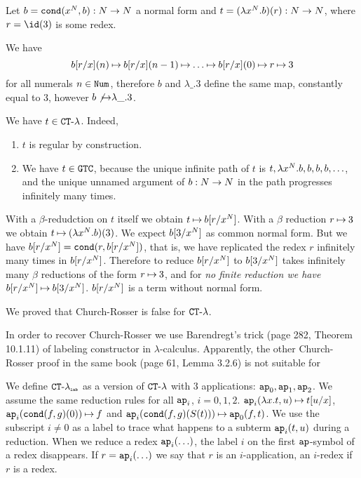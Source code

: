 \begin{Eg}
Let $b = {\tt cond}(x^{{N}},b):{N} \rightarrow {N}$ a normal form
and $t = (\lambda x^{{N}}.b)(r):{N} \rightarrow {N}$, 
where $r = \id(3)$ is some redex. 

We have 
$$b[r/x](n) \mathbin{\mapsto} b[r/x](n-1) \mathbin{\mapsto} \ldots \mathbin{\mapsto} b[r/x](0)\mathbin{\mapsto} r \mathbin{\mapsto} 3$$ 
for all numerals $n \in {\tt Num}$, 
therefore $b$ and $\lambda \_.3$ define the same map, constantly equal to $3$, 
however $b \not \mathbin{\mapsto} \lambda \_.3$.

We have $t \in { {\tt CT} \mbox{-} \lambda}$. Indeed, 
\begin{enumerate}
\item
$t$ is regular by construction.
\item
We have $t \in {\tt GTC}$, because the unique infinite path of $t$ is 
$t, \lambda x^{{N}}.b, b, b, b, \ldots$, and the
unique unnamed argument of $b:{N} \rightarrow {N}$ in the path progresses infinitely many times.
\end{enumerate}

With a $\beta$-redudction on $t$ itself we obtain $t \mathbin{\mapsto} b[r/x^{N}]$.
With a $\beta$ reduction $r \mathbin{\mapsto} 3$ we obtain $t \mathbin{\mapsto}  (\lambda x^{{N}}.b)(3)$.
We expect $b[3/x^{N}]$ as common normal form. But we have $b[r/x^{N}] = {\tt cond}(r,b[r/x^{N}])$,
that is, we have replicated the redex $r$ infinitely many times in $b[r/x^{N}]$. Therefore to reduce 
$b[r/x^{N}]$ to $b[3/x^{N}]$ takes infinitely many $\beta$ reductions of the form $r \mathbin{\mapsto} 3$, 
and for \emph{no finite reduction we have} $b[r/x^{N}] \mathbin{\mapsto} b[3/x^{N}]$. 
$b[r/x^{N}]$ is a term without normal form.

We proved that Church-Rosser is false for ${ {\tt CT} \mbox{-} \lambda}$.
\end{Eg}

In order to recover Church-Rosser we use Barendregt's trick 
(page 282, Theorem 10.1.11) 
of labeling constructor in $\lambda$-calculus.
Apparently, the other Church-Rosser proof in the same book (page 61, Lemma 3.2.6)
is not suitable for 

We define ${{ {\tt CT} \mbox{-} \lambda}_{\mbox{\tiny \tt lab}}}$ as a version of ${ {\tt CT} \mbox{-} \lambda}$ with $3$ applications: 
${\tt ap}_0, {\tt ap}_1, {\tt ap}_2$. We assume the same reduction rules for all ${\tt ap}_i$, $i =0,1,2$.
${\tt ap}_i(\lambda x.t,u) \mathbin{\mapsto} t[u/x]$, ${\tt ap}_i({\tt cond}(f,g)(0)) \mathbin{\mapsto} f$ and
${\tt ap}_i({\tt cond}(f,g)(S(t))) \mathbin{\mapsto} {\tt ap}_0(f,t)$. We use the subscript $i\not = 0$ as a label to trace what
happens to a subterm ${\tt ap}_i(t,u)$ during a reduction. When we reduce a redex ${\tt ap}_i(\ldots)$,
the label $i$ on the first ${\tt ap}$-symbol of a redex disappears. 
If $r = {\tt ap}_i(\ldots)$ we say that $r$ is an $i$-application, an $i$-redex if $r$ is a redex.

